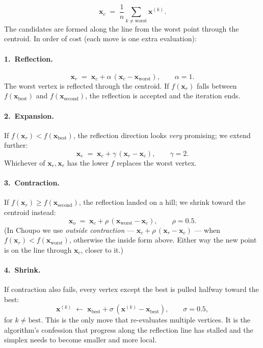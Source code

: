 \documentclass[11pt,a4paper]{article}
\newcommand{\xv}{\mathbf{x}}
\begin{document}
\[
    \xv_c \;=\; \frac{1}{n}\sum_{k \neq \mathrm{worst}} \xv^{(k)}.
\]
The candidates are formed along the line from the worst point through
the centroid.  In order of cost (each move is one extra evaluation):

\paragraph{1.\ Reflection.}
\[
    \xv_r \;=\; \xv_c + \alpha\,(\xv_c - \xv_{\mathrm{worst}}),
    \qquad \alpha = 1.
\]
The worst vertex is reflected through the centroid.  If $f(\xv_r)$
falls between $f(\xv_{\mathrm{best}})$ and $f(\xv_{\mathrm{second}})$,
the reflection is accepted and the iteration ends.

\paragraph{2.\ Expansion.}
If $f(\xv_r) < f(\xv_{\mathrm{best}})$, the reflection direction looks
\emph{very} promising; we extend further:
\[
    \xv_e \;=\; \xv_c + \gamma\,(\xv_r - \xv_c),
    \qquad \gamma = 2.
\]
Whichever of $\xv_e, \xv_r$ has the lower $f$ replaces the worst
vertex.

\paragraph{3.\ Contraction.}
If $f(\xv_r) \ge f(\xv_{\mathrm{second}})$, the reflection landed on a
hill; we shrink toward the centroid instead:
\[
    \xv_o \;=\; \xv_c + \rho\,(\xv_{\mathrm{worst}} - \xv_c),
    \qquad \rho = 0.5.
\]
(In Choupo we use \emph{outside contraction} ---
$\xv_c + \rho\,(\xv_r - \xv_c)$ --- when $f(\xv_r) < f(\xv_{\mathrm{worst}})$,
otherwise the inside form above.  Either way the new point is on the
line through $\xv_c$, closer to it.)

\paragraph{4.\ Shrink.}
If contraction also fails, every vertex except the best is pulled
halfway toward the best:
\[
    \xv^{(k)} \;\leftarrow\;
    \xv_{\mathrm{best}} + \sigma\,(\xv^{(k)} - \xv_{\mathrm{best}}),
    \qquad \sigma = 0.5,
\]
for $k \ne \mathrm{best}$.  This is the only move that re-evaluates
multiple vertices.  It is the algorithm's confession that progress
along the reflection line has stalled and the simplex needs to become
smaller and more local.
\end{document}
